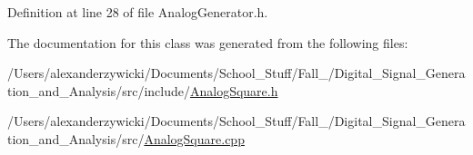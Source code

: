 Definition at line 28 of file Analog\+Generator.\+h.



The documentation for this class was generated from the following files\+:\begin{DoxyCompactItemize}
\item 
/\+Users/alexanderzywicki/\+Documents/\+School\+\_\+\+Stuff/\+Fall\+\_/\+Digital\+\_\+\+Signal\+\_\+\+Generation\+\_\+and\+\_\+\+Analysis/src/include/\hyperlink{AnalogSquare_8h}{Analog\+Square.\+h}\item 
/\+Users/alexanderzywicki/\+Documents/\+School\+\_\+\+Stuff/\+Fall\+\_/\+Digital\+\_\+\+Signal\+\_\+\+Generation\+\_\+and\+\_\+\+Analysis/src/\hyperlink{AnalogSquare_8cpp}{Analog\+Square.\+cpp}\end{DoxyCompactItemize}
